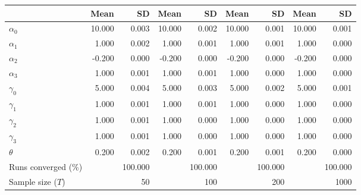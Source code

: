 
\begin{tabular}[t]{lrrrrrrrr}
\toprule
  & Mean & SD & Mean  & SD  & Mean   & SD   & Mean    & SD   \\
\midrule
$\alpha_{0}$ & 10.000 & 0.003 & 10.000 & 0.002 & 10.000 & 0.001 & 10.000 & 0.001\\
$\alpha_{1}$ & 1.000 & 0.002 & 1.000 & 0.001 & 1.000 & 0.001 & 1.000 & 0.000\\
$\alpha_{2}$ & -0.200 & 0.000 & -0.200 & 0.000 & -0.200 & 0.000 & -0.200 & 0.000\\
$\alpha_{3}$ & 1.000 & 0.001 & 1.000 & 0.001 & 1.000 & 0.000 & 1.000 & 0.000\\
$\gamma_{0}$ & 5.000 & 0.004 & 5.000 & 0.003 & 5.000 & 0.002 & 5.000 & 0.001\\
$\gamma_{1}$ & 1.000 & 0.001 & 1.000 & 0.001 & 1.000 & 0.000 & 1.000 & 0.000\\
$\gamma_{2}$ & 1.000 & 0.001 & 1.000 & 0.000 & 1.000 & 0.000 & 1.000 & 0.000\\
$\gamma_{3}$ & 1.000 & 0.001 & 1.000 & 0.000 & 1.000 & 0.000 & 1.000 & 0.000\\
$\theta$ & 0.200 & 0.002 & 0.200 & 0.001 & 0.200 & 0.001 & 0.200 & 0.000\\
Runs converged (\%) &  & 100.000 &  & 100.000 &  & 100.000 &  & 100.000\\
Sample size ($T$) &  & 50 &  & 100 &  & 200 &  & 1000\\
\bottomrule
\end{tabular}
